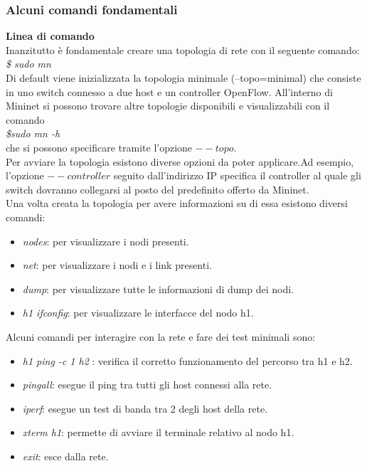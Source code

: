 \subsubsection{Alcuni comandi fondamentali}
\textbf{Linea di comando}
\\Inanzitutto è fondamentale creare una topologia di rete con il seguente comando\cite{walkmin}:
\\\textit{\$ sudo mn}
\\Di default viene inizializzata la topologia minimale (--topo=minimal) che consiste in uno switch connesso a due host e un controller OpenFlow.
All'interno di Mininet si possono trovare altre topologie disponibili e visualizzabili con il comando \\\textit{\$sudo mn -h} \\che si possono specificare tramite l'opzione $--topo$.
\\Per avviare la topologia esistono diverse opzioni da poter applicare.Ad esempio, l'opzione $--controller$ seguito dall'indirizzo IP specifica il controller al quale gli switch dovranno collegarsi al posto 
del predefinito offerto da Mininet.
\\Una volta creata la topologia per avere informazioni su di essa esistono diversi comandi:
\begin{itemize}
    \item \textit{ nodes}: per visualizzare i nodi presenti.
    \item \textit{ net}: per visualizzare i nodi e i link presenti.
    \item \textit{ dump}: per visualizzare tutte le informazioni di dump dei nodi.
    \item \textit{h1 ifconfig}: per visualizzare le interfacce del nodo h1.
\end{itemize}
Alcuni comandi per interagire con la rete e fare dei test minimali sono:
\begin{itemize}
    \item \textit{ h1 ping -c 1 h2 }: verifica il corretto funzionamento del percorso tra h1 e h2.
    \item \textit{ pingall}: esegue il ping tra tutti gli host connessi alla rete.
    \item \textit{ iperf}: esegue un test di banda tra 2 degli host della rete.
    \item \textit{xterm h1}: permette di avviare il terminale relativo al nodo h1.
    \item \textit{exit}: esce dalla rete.
\end{itemize}
